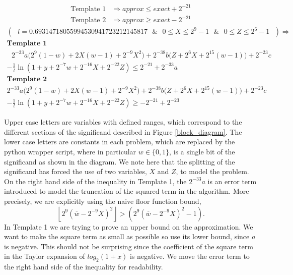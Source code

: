 \documentclass{fac}
\begin{document}
\begin{align*}
    \textrm{Template 1} &\Rightarrow approx \leq exact + 2^{-21} \\
    \textrm{Template 2} &\Rightarrow approx \geq exact - 2^{-21}
\end{align*}
\begin{multline*}
(\textrm{ }l=0.69314718055994530941723212145817\textrm{ } \&\textrm{ } 0\leq X \leq2^9-1\textrm{ } \& \textrm{ }0\leq Z \leq 2^6-1\textrm{ }) \Rightarrow \\ 
\textbf{Template 1} \\
  \textrm{ }  2^{-33} a\Big(2^9(1-w)+2X(w-1)+ 2^{-9}X^{2}\Big)   +  2^{-38} b\Big(Z +2^{6}X + 2^{15}(w-1)\Big)+  2^{-23}c\\
-  \frac{1}{l}\ln(1+y+2^{-7}w+2^{-16}X+2^{-22}Z)      \leq 2^{-21}+2^{-33}a 
\end{multline*} 
\begin{multline*}
\textbf{Template 2} \\
2^{-33} a\Big(2^9(1-w)+2X(w-1)+ 2^{-9}X^{2}\Big)   +  2^{-38} b\Big(Z +2^{6}X + 2^{15}(w-1)\Big)+  2^{-23}c\\
-  \frac{1}{l}\ln(1+y+2^{-7}w+2^{-16}X+2^{-22}Z)      \geq -2^{-21}+2^{-23}
\end{multline*}

Upper case letters are variables with defined ranges, which correspond to the different sections of the significand described in Figure \ref{block_diagram}. The lower case letters are constants in each problem, which are replaced by the python wrapper script, where in particular $w\in \{0,1\}$, is a single bit of the significand as shown in the diagram. We note here that the splitting of the significand has forced the use of two variables, $X$ and $Z$, to model the problem. On the right hand side of the inequality in Template 1, the $2^{-33}a$ is an error term introduced to model the truncation of the squared term in the algorithm. More precisely, we are explicitly using the naive floor function bound,
\begin{equation} \label{a_trunc_term}
    \left \lfloor2^9(\overline{w}-2^{-9}X)^2\right \rfloor  
    >
    (2^9(\overline{w}-2^{-9}X)^2-1).
\end{equation}
In Template 1 we are trying to prove an upper bound on the approximation. We want to make the square term as small as possible so use its lower bound, since $a$ is negative. This should not be surprising since the coefficient of the square term in the Taylor expansion of $log_2(1+x)$ is negative. We move the error term to the right hand side of the inequality for readability. 
\end{document}
